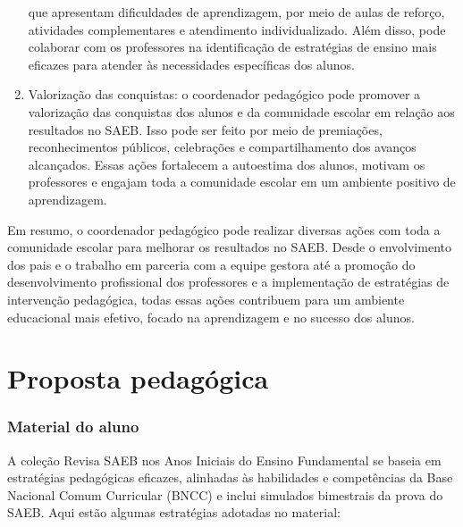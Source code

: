 \begin{enumerate}
  que apresentam dificuldades de aprendizagem, por meio de aulas de
  reforço, atividades complementares e atendimento individualizado. Além
  disso, pode colaborar com os professores na identificação de
  estratégias de ensino mais eficazes para atender às necessidades
  específicas dos alunos.
\item
  Valorização das conquistas: o coordenador pedagógico pode promover a
  valorização das conquistas dos alunos e da comunidade escolar em
  relação aos resultados no SAEB. Isso pode ser feito por meio de
  premiações, reconhecimentos públicos, celebrações e compartilhamento
  dos avanços alcançados. Essas ações fortalecem a autoestima dos
  alunos, motivam os professores e engajam toda a comunidade escolar em
  um ambiente positivo de aprendizagem.
\end{enumerate}

Em resumo, o coordenador pedagógico pode realizar diversas ações com
toda a comunidade escolar para melhorar os resultados no SAEB. Desde o
envolvimento dos pais e o trabalho em parceria com a equipe gestora até
a promoção do desenvolvimento profissional dos professores e a
implementação de estratégias de intervenção pedagógica, todas essas
ações contribuem para um ambiente educacional mais efetivo, focado na
aprendizagem e no sucesso dos alunos.

\section{Proposta pedagógica}

\subsubsection{Material do aluno}\label{material-do-aluno}

A coleção Revisa SAEB nos Anos Iniciais do Ensino Fundamental se baseia
em estratégias pedagógicas eficazes, alinhadas às habilidades e
competências da Base Nacional Comum Curricular (BNCC) e inclui simulados
bimestrais da prova do SAEB. Aqui estão algumas estratégias adotadas no
material:

